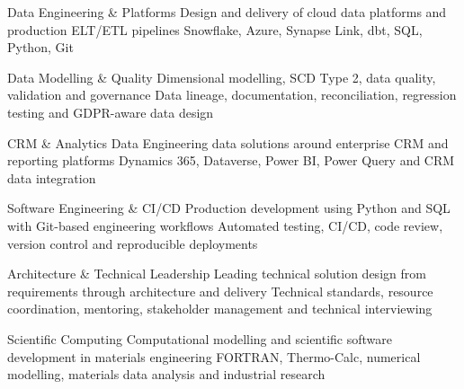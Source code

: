 

\begin{cvskillsnoncentered}

  \cvskill
  {Data Engineering \& Platforms}
  {Design and delivery of cloud data platforms and production ELT/ETL pipelines}
  \cvskill
  {}
  {Snowflake, Azure, Synapse Link, dbt, SQL, Python, Git}

  \cvskill
  {Data Modelling \& Quality}
  {Dimensional modelling, SCD Type 2, data quality, validation and governance}
  \cvskill
  {}
  {Data lineage, documentation, reconciliation, regression testing and GDPR-aware data design}

  \cvskill
  {CRM \& Analytics Data}
  {Engineering data solutions around enterprise CRM and reporting platforms}
  \cvskill
  {}
  {Dynamics 365, Dataverse, Power BI, Power Query and CRM data integration}

  \cvskill
  {Software Engineering \& CI/CD}
  {Production development using Python and SQL with Git-based engineering workflows}
  \cvskill
  {}
  {Automated testing, CI/CD, code review, version control and reproducible deployments}

  \cvskill
  {Architecture \& Technical Leadership}
  {Leading technical solution design from requirements through architecture and delivery}
  \cvskill
  {}
  {Technical standards, resource coordination, mentoring, stakeholder management and technical interviewing}

  \cvskill
  {Scientific Computing}
  {Computational modelling and scientific software development in materials engineering}
  \cvskill
  {}
  {FORTRAN, Thermo-Calc, numerical modelling, materials data analysis and industrial research}

\end{cvskillsnoncentered}